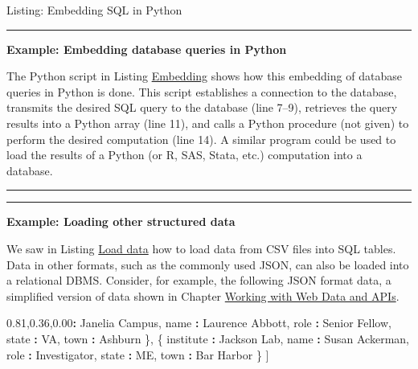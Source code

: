 \documentclass[]{krantz}
\newenvironment{Shaded}{\begin{snugshade}}{\end{snugshade}}
\newcommand{\StringTok}[1]{\textcolor[rgb]{0.31,0.60,0.02}{#1}}
\newcommand{\OperatorTok}[1]{\textcolor[rgb]{0.81,0.36,0.00}{\textbf{#1}}}
\newcommand{\NormalTok}[1]{#1}
\begin{document}
Listing: Embedding SQL in Python

\begin{center}\rule{0.5\linewidth}{\linethickness}\end{center}

\textbf{Example: Embedding database queries in Python}

The Python script in Listing \protect\hyperlink{list:db3}{Embedding}
shows how this embedding of database queries in Python is done. This
script establishes a connection to the database, transmits the desired
SQL query to the database (line 7--9), retrieves the query results into
a Python array (line 11), and calls a Python procedure (not given) to
perform the desired computation (line 14). A similar program could be
used to load the results of a Python (or R, SAS, Stata, etc.)
computation into a database.

\begin{center}\rule{0.5\linewidth}{\linethickness}\end{center}

\begin{center}\rule{0.5\linewidth}{\linethickness}\end{center}

\textbf{Example: Loading other structured data}

We saw in Listing \protect\hyperlink{list:db2}{Load data} how to load
data from CSV files into SQL tables. Data in other formats, such as the
commonly used JSON, can also be loaded into a relational DBMS. Consider,
for example, the following JSON format data, a simplified version of
data shown in Chapter \protect\hyperlink{chap:web}{Working with Web Data
and APIs}.

\begin{Shaded}
\begin{Highlighting}[]
\NormalTok{[}
\NormalTok{  \{}
\NormalTok{    institute }\OperatorTok{:}\StringTok{ }\NormalTok{Janelia Campus,}
\NormalTok{    name }\OperatorTok{:}\StringTok{ }\NormalTok{Laurence Abbott,}
\NormalTok{    role }\OperatorTok{:}\StringTok{ }\NormalTok{Senior Fellow,}
\NormalTok{    state }\OperatorTok{:}\StringTok{ }\NormalTok{VA,}
\NormalTok{    town }\OperatorTok{:}\StringTok{ }\NormalTok{Ashburn}
\NormalTok{  \},}
\NormalTok{  \{}
\NormalTok{    institute }\OperatorTok{:}\StringTok{ }\NormalTok{Jackson Lab,}
\NormalTok{    name }\OperatorTok{:}\StringTok{ }\NormalTok{Susan Ackerman,}
\NormalTok{    role }\OperatorTok{:}\StringTok{ }\NormalTok{Investigator,}
\NormalTok{    state }\OperatorTok{:}\StringTok{ }\NormalTok{ME,}
\NormalTok{    town }\OperatorTok{:}\StringTok{ }\NormalTok{Bar Harbor}
\NormalTok{  \}}
\NormalTok{]}
\end{Highlighting}
\end{Shaded}
\end{document}
